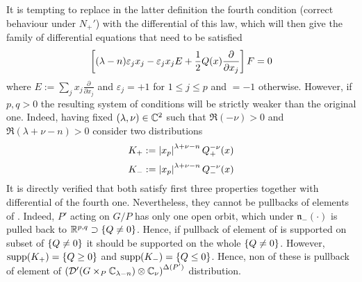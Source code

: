 \documentclass[10pt]{article} %
\newcommand{\D}{\mathcal{D}}
\theoremstyle{definition}
\theoremstyle{remark}
\begin{document}
It is tempting to replace in the latter definition
the fourth condition (correct behaviour under $N_+'$) with the differential of this
law, which will then give the family of differential equations that need to be satisfied
\begin{equation}
\left[(\lambda-n)\varepsilon_jx_j-\varepsilon_jx_jE+\frac{ 1 }{ 2 }Q(x)\frac{ \partial}{ \partial x_j } \right]F=0
	\label{Ndiff}
\end{equation}
where $E:=\sum_j x_j\frac{ \partial }{ \partial x_j }$ and $\varepsilon_j=+1$ for $1\leq j\leq p$ and $=-1$ otherwise.
However, if $p,q>0$ the resulting system of conditions will be strictly weaker than the original one. Indeed, having
fixed $(\lambda,\nu)\in\mathbb{C}^2$ such that $\Re(-\nu)>0$ and $\Re(\lambda+\nu-n)>0$ consider two distributions
\[K_+:=\left| x_p \right|^{ \lambda+\nu-n }Q_+^{ -\nu }(x)\]
\[K_-:=\left| x_p \right|^{ \lambda+\nu-n }Q_-^{ -\nu }(x)\]
It is directly verified that both satisfy first three properties together with differential of the fourth one. Nevertheless,
they cannot be pullbacks of elements of \sone. Indeed, $P'$ acting on $G/P$
has only one open orbit, which under $\mathfrak{n}_-(\cdot)$ is pulled back to $\mathbb{R}^{ p,q }\supset\left\{ Q\neq0 \right\}$.
Hence, if pullback of element of \sone is supported on subset of $\left\{ Q\neq0 \right\}$
it should be supported on the whole $\left\{ Q\neq0 \right\}$. However, $\operatorname{supp}(K_+)=\left\{ Q\geq0 \right\}$ and
$\operatorname{supp}(K_-)=\left\{ Q\leq0 \right\}$. Hence, non of these is pullback of element of 
$\mybra{\D'(G\times_P\C_{\lambda-n} )\otimes\C_\nu}^{\Delta(P')}$ distribution.
\end{document}

